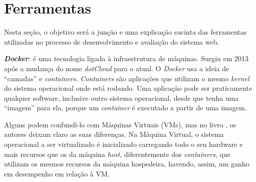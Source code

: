 % 
% 


\hspace{2.5cm}
\section{Ferramentas}
\label{sec:ferramentas}

\hspace{2.5cm}

Nesta seção, o objetivo será a junção e uma explicação sucinta das ferramentas utilizadas no processo de desenvolvimento e avaliação do sistema web.  




%  

\textbf{\textit{Docker}}: é uma tecnologia ligada à infraestrutura de máquinas. Surgiu em 2013 após a mudança do nome \textit{dotCloud} para o atual. O \textit{Docker} usa a ideia de ``camadas'' e \textit{containers}. \textit{Containers} são aplicações que utilizam o mesmo \textit{kernel} do sistema operacional onde está rodando. Uma aplicação pode ser praticamente qualquer software, inclusive outro sistema operacional, desde que tenha uma ``imagem'' para ela, porque um \textit{container} é executado a partir de uma imagem.

Alguns podem confundí-lo com Máquinas Virtuais (VMs), mas no livro , os autores deixam claro as suas diferenças. Na Máquina Virtual, o sistema operacional a ser virtualizado é inicializado carregando todo o seu hardware e mais recursos que os da máquina \textit{host}, diferentemente dos \textit{containers}, que utilizam os mesmos recursos da máquina hospedeira, havendo, assim, um ganho em desempenho em relação à VM.

